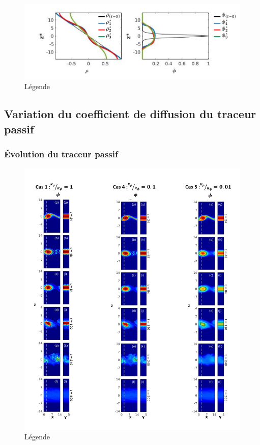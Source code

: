 \documentclass[a4paper,12pt]{article}
\begin{document}
    \begin{figure}[!h]
        \centering
        \label{rhodiff_profils_Krho}
        \includegraphics[width=1\linewidth]{figures/rhodiff_profils_fin.png}
        \caption{Légende}
    \end{figure}
    
    
  \subsection{Variation du coefficient de diffusion du traceur passif}
  
    \subsubsection{Évolution du traceur passif}
    
    \begin{figure}[!h]
        \centering
        \label{phidiff}
        \includegraphics[width=0.90\linewidth]{figures/phidiff_contour.png}
        \caption{Légende}
    \end{figure}
    
\end{document}
